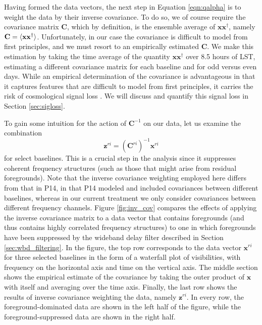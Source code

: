 \documentclass[twocolumn,numberedappendix]{emulateapj} \shorttitle{New Limits on the 21 cm Power Spectrum at $z=8.4$}
\newcommand{\x}{\mathbf{x}} \newcommand{\xhat}{\hat{\mathbf{x}}}
\begin{document}
Having formed the data vectors, the next step in Equation \eqref{eqn:qalpha} is to
weight the data by their inverse covariance. To do so, we of course require the covariance
matrix $\mathbf{C}$, which by definition, is the ensemble average of
$\x\x^\dagger$, namely $\mathbf{C} = \expval{\x\x^\dagger}$. Unfortunately, in our case the
covariance is difficult to model from first principles, and we must resort to an
empirically estimated $\mathbf{C}$. We make this estimation by taking the time average
of the quantity $\x\x^\dagger$ over 8.5 hours of LST, estimating a different covariance matrix
for each baseline and for odd versus even days. While an empirical determination of the covariance is advantageous
in that it captures features that are difficult to model from first principles, it
carries the risk of cosmological signal loss \citep{switzer_liu2014}. We will discuss and quantify this signal loss
in Section \ref{sec:sigloss}.

To gain some intuition for the action of $\mathbf{C}^{-1}$ on our data, let us examine the
combination
\begin{equation}\label{eqn:z}
    \mathbf{z}^{ri} =  (\mathbf{C}^{ri})^{-1}\mathbf{x}^{ri}
\end{equation}
for select baselines. This is a crucial
step in the analysis since it suppresses coherent frequency structures (such as those
that might arise from residual foregrounds). Note that the inverse covariance weighting employed
here differs from that in P14, in that P14 modeled and included covariances between
different baselines, whereas in our current treatment we only consider covariances between
different frequency channels. 
Figure \ref{fig:inv_cov} compares the effects of applying
the inverse covariance matrix to a data vector that contains foregrounds (and thus contains
highly correlated frequency structures) to one in which foregrounds have been suppressed
by the wideband
delay filter described in Section \ref{sec:wbd_filtering}. In the figure, the
top row corresponds to the data vector $\mathbf{x}^{ri}$ for three selected baselines in the form
of a waterfall plot of
visibilities, with frequency on the horizontal axis and time on the vertical axis. The
middle section shows the empirical estimate of the covariance by taking the
outer product of $\x$ with itself and averaging over the time axis. Finally,
the last row shows the results of inverse covariance weighting the data,
namely $\mathbf{z}^{ri}$. In every row, the foreground-dominated data are shown
in the left half of the figure, while the foreground-suppressed data are shown in the right half.
\end{document}
